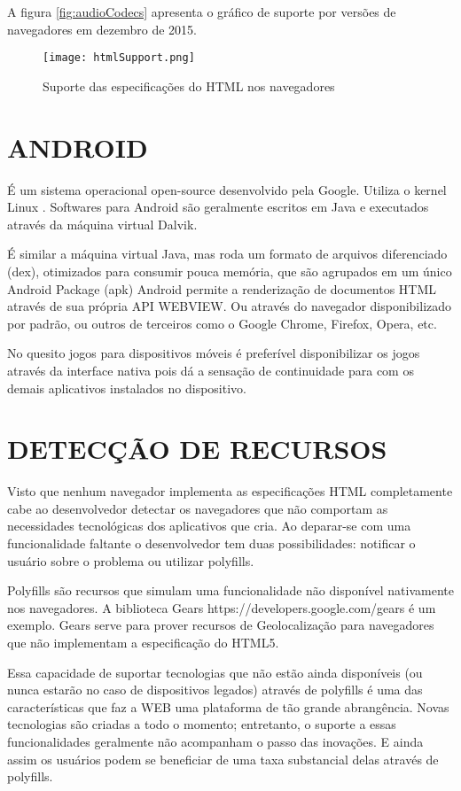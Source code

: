 A figura \ref{fig:audioCodecs} apresenta o gráfico de suporte por versões de navegadores em dezembro de 2015.

\begin{figure}
    \centering
    \texttt{[image: htmlSupport.png]}
	\caption{Suporte das especificações do HTML nos navegadores}
    \label{fig:htmlSupport}
\end{figure}

\section{ANDROID}

É um sistema operacional open-source desenvolvido pela Google. Utiliza
o kernel Linux . Softwares para Android são geralmente escritos em Java
e executados através da máquina virtual Dalvik.

É similar a máquina virtual Java, mas roda um formato de arquivos
diferenciado (dex), otimizados para consumir pouca memória, que
são agrupados em um único Android Package (apk) Android permite a
renderização de documentos HTML através de sua própria API WEBVIEW.
Ou através do navegador disponibilizado por padrão, ou outros de
terceiros como o Google Chrome, Firefox, Opera, etc.

No quesito jogos para dispositivos móveis é preferível disponibilizar
os jogos através da interface nativa pois dá a sensação de
continuidade para com os demais aplicativos instalados no dispositivo.

\section{DETECÇÃO DE RECURSOS}
Visto que nenhum navegador implementa as especificações HTML
completamente cabe ao desenvolvedor detectar os navegadores que não
comportam as necessidades tecnológicas dos aplicativos que cria. Ao
deparar-se com uma funcionalidade faltante o desenvolvedor tem duas
possibilidades: notificar o usuário sobre o problema ou utilizar
polyfills.

Polyfills são recursos que simulam uma funcionalidade não
disponível nativamente nos navegadores. A biblioteca Gears
https://developers.google.com/gears é um exemplo. Gears
serve para prover recursos de Geolocalização para navegadores que
não implementam a especificação do HTML5. 

Essa capacidade de suportar tecnologias que não estão ainda
disponíveis (ou nunca estarão no caso de dispositivos legados)
através de polyfills é uma das características que faz a WEB uma
plataforma de tão grande abrangência. Novas tecnologias são criadas a
todo o momento; entretanto, o suporte a essas funcionalidades geralmente
não acompanham o passo das inovações. E ainda assim os usuários
podem se beneficiar de uma taxa substancial delas através de polyfills.

